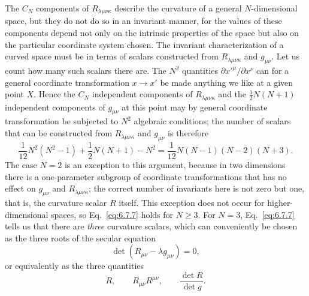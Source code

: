The \(C_N\) components of \(R_{\lambda\mu\nu\kappa}\) describe the curvature
of a general
\(N\)-dimensional space, but they do not do so in an invariant manner, for
the values of these components depend not only on the intrinsic properties
of the space but also on the particular coordinate system chosen. The
invariant characterization of a curved space must be in terms of scalars
constructed from \(R_{\lambda\mu\nu\kappa}\) and \(g_{\mu\nu}\). Let us count
how many such scalars there are. The \(N^2\) quantities
\(\partial x'^\mu/\partial x^\nu\) can for a general coordinate
transformation \(x\to x'\) be made anything we like at a given point \(X\).
Hence the \(C_N\) independent components of \(R_{\lambda\mu\nu\kappa}\) and
the \(\tfrac12N(N+1)\) independent
components of \(g_{\mu\nu}\) at this point may by general coordinate
transformation be subjected to \(N^2\) algebraic conditions; the number of
scalars that can be constructed from \(R_{\lambda\mu\nu\kappa}\) and
\(g_{\mu\nu}\) is therefore
\begin{equation}
  \frac1{12}N^2(N^2-1)
  +\frac12N(N+1)-N^2
  =
  \frac1{12}N(N-1)(N-2)(N+3).
  \tag{6.7.7}\label{eq:6.7.7}
\end{equation}
The case \(N=2\) is an exception to this argument, because in two dimensions
there is a one-parameter subgroup of coordinate transformations that has no
effect on \(g_{\mu\nu}\) and \(R_{\lambda\mu\nu\kappa}\); the correct number
of invariants here is not zero but one, that is, the curvature scalar \(R\)
itself. This exception does not occur for higher-dimensional spaces, so
Eq.~\eqref{eq:6.7.7} holds for \(N\geq3\). For \(N=3\),
Eq.~\eqref{eq:6.7.7} tells us that there are \emph{three} curvature scalars,
which can conveniently be chosen as the three roots of the secular equation
\[
  \det(R_{\mu\nu}-\lambda g_{\mu\nu})=0,
\]
or equivalently as the three quantities
\[
  R,
  \qquad
  R_{\mu\nu}R^{\mu\nu},
  \qquad
  \frac{\det R}{\det g}.
\]

